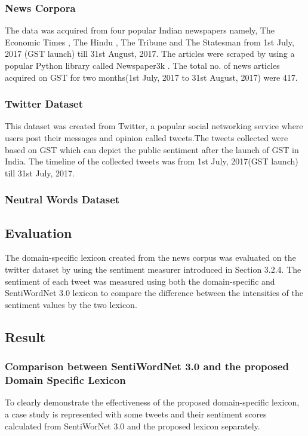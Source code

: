 \documentclass[a4paper, 10pt, conference]{ieeeconf}      %
\begin{document}
\subsubsection{News Corpora}

The data was acquired from four popular Indian newspapers namely, The Economic Times \cite{c1}, The Hindu \cite{c2}, The Tribune \cite{c3} and The Statesman \cite{c4} from  1st July, 2017 (GST launch) till 31st August, 2017. The articles were scraped by using a popular Python library called Newspaper3k \cite{c5}. The total no. of news articles acquired on GST for two months(1st July, 2017 to 31st August, 2017) were 417.

\subsubsection{Twitter Dataset}
This dataset was created from Twitter, a popular social networking service where users post their messages and opinion called tweets.The tweets collected were based on GST which can depict the public sentiment after the launch of GST in India. The timeline of the collected tweets was from 1st July, 2017(GST launch) till 31st July, 2017.

\subsubsection{Neutral Words Dataset}
\subsection{Evaluation}
The domain-specific lexicon created from the news corpus was evaluated on the twitter dataset by using the sentiment measurer introduced in Section 3.2.4. The sentiment of each tweet was measured using both the domain-specific and SentiWordNet 3.0 lexicon to compare the difference between the intensities of the sentiment values by the two lexicon.

\subsection{Result}
\subsubsection{Comparison between SentiWordNet 3.0 and the proposed Domain Specific Lexicon}

To clearly demonstrate the effectiveness of the proposed domain-specific lexicon, a case study is represented with some tweets and their sentiment scores calculated from SentiWorNet 3.0 and the proposed lexicon separately.
\end{document}
